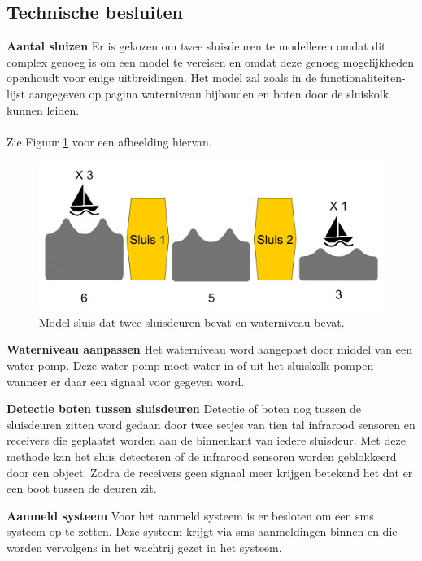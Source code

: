 \documentclass{article}
\begin{document}
\subsection{Technische besluiten}
\textbf{Aantal sluizen}\newline
Er is gekozen om twee sluisdeuren te modelleren omdat dit complex genoeg is om een model te vereisen en omdat deze genoeg mogelijkheden openhoudt voor enige uitbreidingen. Het model zal zoals in de functionaliteiten-lijst aangegeven op pagina \pageref{sec:FuncList} waterniveau bijhouden en boten door de sluiskolk kunnen leiden.\\\\
Zie Figuur \ref{fig:sluiceWaterLv} voor een afbeelding hiervan. 
\begin{figure}[!h]
	\centering
	\includegraphics[width=\textwidth]{images/sluis_model.png}
    \caption{Model sluis dat twee sluisdeuren bevat en waterniveau bevat.}
	\label{fig:sluiceWaterLv}
\end{figure}

\noindent\textbf{Waterniveau aanpassen}\newline
Het waterniveau word aangepast door middel van een water pomp. Deze water pomp moet water in of uit het sluiskolk pompen wanneer er daar een signaal voor gegeven word.\newline

\noindent\textbf{Detectie boten tussen sluisdeuren}\newline
Detectie of boten nog tussen de sluisdeuren zitten word gedaan door twee setjes van tien tal infrarood sensoren en receivers die geplaatst worden aan de binnenkant van iedere sluisdeur. Met deze methode kan het sluis detecteren of de infrarood sensoren worden geblokkeerd door een object. Zodra de receivers geen signaal meer krijgen betekend het dat er een boot tussen de deuren zit.\newline

\noindent\textbf{Aanmeld systeem}\newline
Voor het aanmeld systeem is er besloten om een sms systeem op te zetten. Deze systeem krijgt via sms aanmeldingen binnen en die worden vervolgens in het wachtrij gezet in het systeem. \newline
\end{document}
